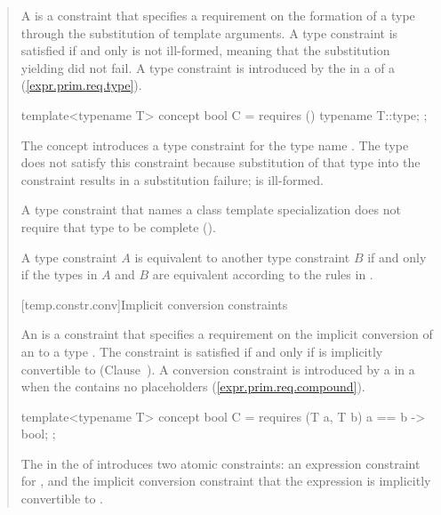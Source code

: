 \begin{quote}
\pnum
A  is a constraint that specifies a requirement 
on the formation of a type  through the substitution of template 
arguments.
% 
A type constraint is satisfied if and only  is not ill-formed, meaning 
that the substitution yielding  did not fail.
% 
\enternote
A type constraint is introduced by the  in a
 of a 
(\ref{expr.prim.req.type}).
\exitnote
% 
\enterexample
\begin{codeblock}
template<typename T> concept bool C = requires () { typename T::type; };
\end{codeblock}
The concept  introduces a type constraint for the 
type name .
% 
The type  does not satisfy this constraint
because substitution of that type into the constraint results in a
substitution failure;  is ill-formed.
\exitexample

\pnum
A type constraint that names a class template specialization 
does not require that type to be complete 
().

\pnum
A type constraint $A$ is equivalent to another type constraint $B$ if and 
only if the types in $A$ and $B$ are equivalent according to the rules in
.


[temp.constr.conv]{Implicit conversion constraints}

\pnum
An  is a constraint that 
specifies a requirement on the implicit conversion of an 
 to a type . 
% 
The constraint is satisfied if and only if  is implicitly convertible 
to  (Clause~).
% 
\enternote
A conversion constraint is introduced by a  
in a  when the 
 contains no placeholders 
(\ref{expr.prim.req.compound}).
\exitnote
% 
\enterexample
\begin{codeblock}
template<typename T> concept bool C = 
  requires (T a, T b) {
    { a == b } -> bool;
  };
\end{codeblock}
The  in the
 of  introduces two atomic 
constraints: an expression constraint for , and the implicit 
conversion constraint that the expression  is implicitly 
convertible to .
\exitexample


\end{quote}
